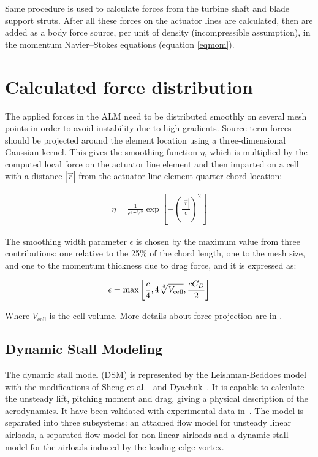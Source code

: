 \documentclass[a4paper]{jpconf}
\begin{document}
Same procedure is used to calculate forces from the turbine shaft and blade
support struts. After all these forces on the actuator lines are calculated,
then are added as a body force source, per unit of density (incompressible
assumption), in the momentum Navier--Stokes equations (equation \ref{eqmom}).

\section*{Calculated force distribution}
The applied forces in the ALM need to be distributed smoothly on several mesh points in order to avoid instability due to high gradients. Source term forces should be projected around the element location using a three-dimensional Gaussian kernel. This gives the smoothing function $\eta$, which is multiplied by the computed local force on the actuator line element and then imparted on a cell with a distance $| \vec r |$ from the actuator line element quarter chord location:

\begin{align*}
\eta = \frac{1}{\epsilon ^3 \pi ^{3/2} } \exp \left[ - \left( \frac{| \vec r |}{\epsilon} \right) ^2 \right]
\end{align*}

The smoothing width parameter $\epsilon$ is chosen by the maximum value from three contributions: one relative to the 25\% of the chord length, one to the mesh size, and one to the momentum thickness due to drag force, and it is expressed as:

\begin{align*}
\epsilon = \max \left[ \frac{c}{4},4 \sqrt[\leftroot{-2}\uproot{2}3]{V_{\mathrm{cell}}},  \frac{c C_D}{2}\right]
\end{align*}

Where ${V_{\mathrm{cell}}}$ is the cell volume. More details about force projection are in \cite{Bachant2016-VAT-ALM}.


\subsection{Dynamic Stall Modeling}

The dynamic stall model (DSM) is represented by the Leishman-Beddoes
model~\cite{leishman1986generalised} with the modifications of Sheng et
al.~\cite{sheng2008modified} and Dyachuk~\cite{dyachuk}. It is capable to
calculate the unsteady lift, pitching moment and drag, giving a physical
description of the aerodynamics. It have been validated with experimental data
in~\cite{leishman1989semi}. The model is separated into three subsystems: an
attached flow model for unsteady linear airloads, a separated flow model for
non-linear airloads and a dynamic stall model for the airloads induced by the
leading edge vortex.
\end{document}
